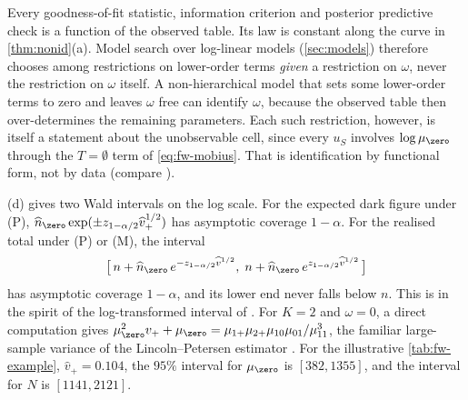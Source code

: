 \begin{remark}\label{rem:id-untestable}
Every goodness-of-fit statistic, information criterion and posterior predictive check is a function of the observed table. Its law is constant along the curve in \cref{thm:nonid}(a). Model search over log-linear models (\cref{sec:models}) therefore chooses among restrictions on lower-order terms \emph{given} a restriction on $\omega$, never the restriction on $\omega$ itself. A non-hierarchical model that sets some lower-order terms to zero and leaves $\omega$ free can identify $\omega$, because the observed table then over-determines the remaining parameters. Each such restriction, however, is itself a statement about the unobservable cell, since every $u_S$ involves $\log\mu_{\zero}$ through the $T=\emptyset$ term of \eqref{eq:fw-mobius}. That is identification by functional form, not by data (compare \citealp{fienberg1972,international1995}).
\end{remark}

\begin{remark}[Intervals]\label{rem:id-intervals}
(d) gives two Wald intervals on the log scale. For the expected dark figure under (P), $\widehat n_{\zero}\exp(\pm z_{1-\alpha/2}\widehat v_+^{1/2})$ has asymptotic coverage $1-\alpha$. For the realised total under (P) or (M), the interval
\[
  \bigl[\,n+\widehat n_{\zero}\,e^{-z_{1-\alpha/2}\widehat v^{1/2}},\;n+\widehat n_{\zero}\,e^{z_{1-\alpha/2}\widehat v^{1/2}}\,\bigr]
\]
has asymptotic coverage $1-\alpha$, and its lower end never falls below $n$. This is in the spirit of the log-transformed interval of \citet{chao1987}. For $K=2$ and $\omega=0$, a direct computation gives $\mu_{\zero}^2v_++\mu_{\zero}=\mu_{1+}\mu_{2+}\mu_{10}\mu_{01}/\mu_{11}^3$, the familiar large-sample variance of the Lincoln--Petersen estimator \citep{bishop1975}. For the illustrative \cref{tab:fw-example}, $\widehat v_+=0.104$, the $95\%$ interval for $\mu_{\zero}$ is $[382,1355]$, and the interval for $N$ is $[1141,2121]$.
\end{remark}

